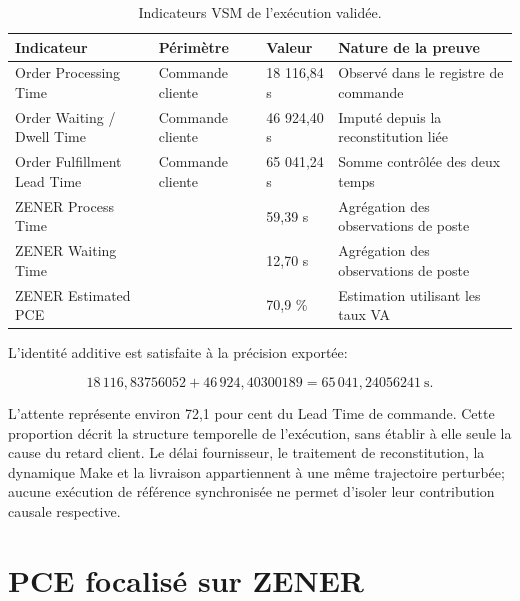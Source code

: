 \begin{table}[H]
  \centering
  \caption{Indicateurs VSM de l'exécution validée.}
  \label{tab:vsm-six-indicateurs}
  \begin{tabularx}{\textwidth}{@{}L{0.31\textwidth}L{0.24\textwidth}L{0.17\textwidth}Y@{}}
    \toprule
    Indicateur & Périmètre & Valeur & Nature de la preuve \\
    \midrule
    Order Processing Time & Commande cliente & 18 116,84 s & Observé dans le registre de commande \\
    Order Waiting / Dwell Time & Commande cliente & 46 924,40 s & Imputé depuis la reconstitution liée \\
    Order Fulfillment Lead Time & Commande cliente & 65 041,24 s & Somme contrôlée des deux temps \\
    ZENER Process Time &  & 59,39 s & Agrégation des observations de poste \\
    ZENER Waiting Time &  & 12,70 s & Agrégation des observations de poste \\
    ZENER Estimated PCE &  & 70,9 \% & Estimation utilisant les taux VA \\
    \bottomrule
  \end{tabularx}
\end{table}

L'identité additive est satisfaite à la précision exportée:

\begin{equation}
18\,116{,}83756052 + 46\,924{,}40300189 = 65\,041{,}24056241\ \mathrm{s}.
\label{eq:identite-vsm-commande}
\end{equation}

L'attente représente environ 72,1 pour cent du Lead Time de commande. Cette proportion décrit la structure temporelle de l'exécution, sans établir à elle seule la cause du retard client. Le délai fournisseur, le traitement de reconstitution, la dynamique Make et la livraison appartiennent à une même trajectoire perturbée; aucune exécution de référence synchronisée ne permet d'isoler leur contribution causale respective.


\section{PCE focalisé sur ZENER}

